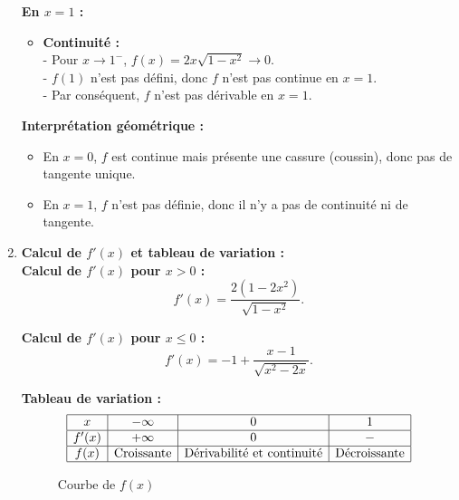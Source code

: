 \documentclass{article}
\begin{document}
\begin{enumerate}
    \textbf{En \( x = 1 \) :}
    \begin{itemize}
        \item \textbf{Continuité :} \\
        - Pour \( x \to 1^- \), \( f(x) = 2x\sqrt{1 - x^2} \to 0 \). \\
        - \( f(1) \) n'est pas défini, donc \( f \) n'est pas continue en \( x = 1 \). \\
        - Par conséquent, \( f \) n'est pas dérivable en \( x = 1 \).
    \end{itemize}

    \textbf{Interprétation géométrique :}
    \begin{itemize}
        \item En \( x = 0 \), \( f \) est continue mais présente une cassure (coussin), donc pas de tangente unique.
        \item En \( x = 1 \), \( f \) n'est pas définie, donc il n'y a pas de continuité ni de tangente.
    \end{itemize}

    \item \textbf{Calcul de \( f'(x) \) et tableau de variation :} \\

    \textbf{Calcul de \( f'(x) \) pour \( x > 0 \) :}
    \[
    f'(x) = \frac{2(1 - 2x^2)}{\sqrt{1 - x^2}}.
    \]

    \textbf{Calcul de \( f'(x) \) pour \( x \leq 0 \) :}
    \[
    f'(x) = -1 + \frac{x - 1}{\sqrt{x^2 - 2x}}.
    \]

    \textbf{Tableau de variation :}
    \[
    \begin{array}{|c|c|c|c|}
    \hline
    x & -\infty & 0 & 1 \\
    \hline
    f'(x) & +\infty & 0 & - \\
    \hline
    f(x) & \text{Croissante} & \text{Dérivabilité et continuité} & \text{Décroissante} \\
    \hline
    \end{array}
    \]

\begin{figure}[h!]
\centering
{}
\caption{Courbe de \( f(x) \)}
\end{figure}

\end{enumerate}
\end{document}
